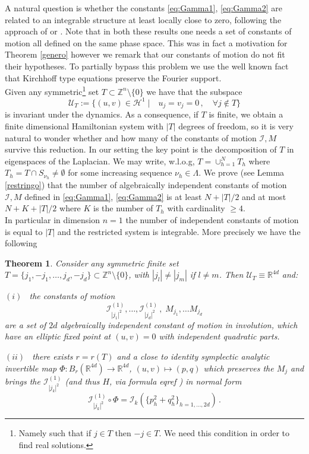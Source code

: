 \documentclass[reqno,11pt]{amsart}
\theoremstyle{plain}
\numberwithin{equation}{section}
\newtheorem{theorem}{Theorem}[section]
\newcommand{\R}{\mathbb{R}}
\newcommand{\Z}{\mathbb{Z}}
\renewcommand{\H}{\mathcal{H}}
\newcommand{\cI}{{\mathcal I}}
\begin{document}
A natural question is whether the  constants \eqref{eq:Gamma1}, \eqref{eq:Gamma2} are related to an integrable structure at least locally close to zero, following the approach of \cite{KuksinPerelman2010} or \cite{BambusiStolovitch2020}. Note that in both these results one needs a set of constants of motion all defined on the same phase space. This was in fact a motivation for Theorem \ref{genero} however we remark that our constants of motion do not fit their hypotheses. To partially bypass this problem we use the 
 well known fact  that  Kirchhoff type equations preserve the Fourier support.
\\
Given any symmetric\footnote{Namely such that if $j\in T$ then $-j\in T$. We need this condition in order to find real solutions.} set $T\subset \Z^n\setminus\{0\}$ we have that the subspace
\begin{equation}
	\label{UT}
	\mathscr{U}_T:=\{(u,v)\in \H^1 \;\vert{} \quad u_j=v_j=0 \,,\quad \forall j\notin T \}
\end{equation}
is invariant under the dynamics.
As a consequence, if $T$ is finite, we obtain a finite dimensional Hamiltonian system with $|T|$ degrees of freedom, so it is very natural to wonder whether and how many of  the constants of motion $\cI,M$  survive this reduction.  In our setting the key point is the decomposition of $T$ in eigenspaces of the Laplacian. 	We may write, w.l.o.g, $T=\cup_{h=1}^N T_h$ where $T_h= T\cap S_{\nu_h}\neq \emptyset$ for some  increasing sequence $\nu_h\in \Lambda$. We prove (see Lemma \ref{restringo}) that the number of algebraically independent constants of motion $\cI,M$ defined in \eqref{eq:Gamma1}, \eqref{eq:Gamma2} is at least $N+|T|/2$ and at most
$
N + K+ |T|/2   
$
where $K$ is the number of $T_h$ with cardinality $\geq 4$.
\\
In particular in dimension $n=1$ the number of independent constants of motion is equal to $|T|$ and the restricted system is integrable. 
More precisely we have the following
\begin{theorem}\label{finito}
	Consider any symmetric finite set $T=\{j_1,-j_1,\dots, j_d,-j_d\}\subset  \Z^n\setminus\{0\}$, with $|j_l| \neq | j_m|$ if $l\neq m$. Then $\mathscr{U}_T\equiv  \R^{4d}$ and:
	
	$(i)$ \ the constants of motion
	\begin{equation}
		\label{massimali?}
		\cI^{(1)}_{|j_1|^2},\dots, \cI^{(1)}_{|j_d|^2}\,,\; M_{j_1},\dots M_{j_d}
	\end{equation}
	are a set of $2d$ algebraically independent constant of motion in involution, which have an elliptic fixed point at $(u,v)=0$ with independent quadratic parts.
	
	
	$(ii)$ \ there exists $r=r(T)$ and a close to identity  symplectic analytic invertible map $\Phi: B_r(\R^{4d}) \to \R^{4d}$, $(u,v)\mapsto (p,q)$ which preserves the $M_j$ and brings the $\cI^{(1)}_{|j_k|^2}$ (and thus $H$, via formula eqref{} ) in normal form $$\cI^{(1)}_{|j_k|^2}\circ \Phi=\mathscr{I}_{k}(\{p_{h}^2+q_{h}^2\}_{h=1,\dots,2d })\,.$$
\end{theorem}
\end{document}

